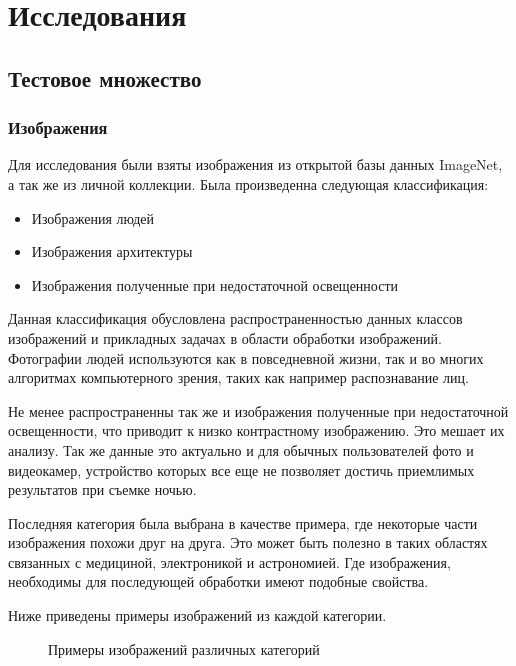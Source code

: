\section{Исследования}
\subsection{Тестовое множество}
\subsubsection{Изображения}
Для исследования были взяты изображения из открытой базы данных ImageNet, а так же из личной коллекции. Была произведенна следующая классификация:
\begin{itemize}
	\item Изображения людей
	\item Изображения архитектуры
	\item Изображения полученные при недостаточной освещенности
\end{itemize}
Данная классификация обусловлена распространенностью данных классов изображений и прикладных задачах в области обработки изображений. Фотографии людей используются как в повседневной жизни, так и во многих алгоритмах компьютерного зрения, таких как например распознавание лиц.

Не менее распространенны так же и изображения полученные при недостаточной освещенности, что приводит к низко контрастному изображению. Это мешает их анализу. Так же данные это актуально и для обычных пользователей фото и видеокамер, устройство которых все еще не позволяет достичь приемлимых результатов при съемке ночью. 

Последняя категория была выбрана в качестве примера, где  некоторые части изображения похожи друг на друга. Это может быть полезно в таких областях связанных с медициной, электроникой и астрономией. Где изображения, необходимы для последующей обработки имеют подобные свойства.

Ниже приведены примеры изображений из каждой категории.

\begin{figure}[H]
	\begin{minipage}[H]{0.49\linewidth}
	\end{minipage}
	\begin{minipage}[H]{0.49\linewidth}
	\end{minipage}
\begin{center}
	\begin{minipage}[H]{0.49\linewidth}
	\end{minipage}
\end{center}
	\caption{Примеры изображений различных категорий}
\end{figure}


